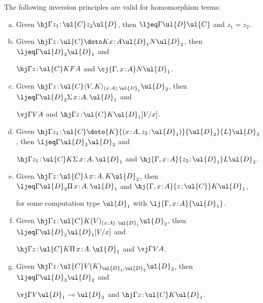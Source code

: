 \begin{proposition}
\label{prop:homterminversion}
The following inversion principles are valid for homomorphism terms:
\begin{enumerate}[(a)]
\item Given $\hj \Gamma {z_1 \!:\! \ul{C}} {z_2} \ul{D}$, then $\ljeq \Gamma {\ul{D}} {\ul{C}}$ and $z_1 = z_2$.
\item Given $\hj \Gamma {z \!:\! \ul{C}} {\doto K {x \!:\! A} {\ul{D}_1} {N}} \ul{D}_2$, then $\ljeq \Gamma {\ul{D}_2} {\ul{D}_1}$ and 

\vspace{-0.2cm}
\hfill $\hj \Gamma {z \!:\! \ul{C}} K {FA}$ and $\cj {\Gamma, x \!:\! A} N {\ul{D}_1}$.
\item Given $\hj \Gamma {z \!:\! \ul{C}} {\langle V , K \rangle_{(x : A).\ul{D}_1}} {\ul{D}_2}$, then $\ljeq \Gamma {\ul{D}_2} {\Sigma\, x \!:\! A .\, \ul{D}_1}$ and 

\vspace{-0.2cm}
\hfill $\vj \Gamma V A$ and $\hj \Gamma {z \!:\! \ul{C}} K {\ul{D}_1[V/x]}$.
\item Given $\hj \Gamma {z_1 \!:\! \ul{C}} {\doto {K} {(x \!:\! A , z_2 \!:\! \ul{D}_1)} {\ul{D}_2} {L}} {\ul{D}_3}$, then $\ljeq \Gamma {\ul{D}_3} {\ul{D}_2}$ and 

\vspace{-0.2cm}
\hfill $\hj \Gamma {z_1 \!:\! \ul{C}} K {\Sigma\, x \!:\! A .\, \ul{D}_1}$ and $\hj {\Gamma, x \!:\! A} {z_2 \!:\! \ul{D}_1} L {\ul{D}_2}$.
\item Given $\hj \Gamma {z \!:\! \ul{C}} {\lambda\, x \!:\! A .\, K} {\ul{D}_2}$, then $\ljeq \Gamma {\ul{D}_2} {\Pi\, x \!:\! A .\, \ul{D}_1}$ and $\hj {\Gamma, x \!:\! A} {z \!:\! \ul{C}} K {\ul{D}_1}$, 

\vspace{-0.2cm}
\hfill for some computation type $\ul{D}_1$ with $\lj {\Gamma, x \!:\! A} {\ul{D}_1}$.
\item Given $\hj \Gamma {z \!:\! \ul{C}} {K(V)_{(x : A) .\, \ul{D}_1}} {\ul{D}_2}$, then $\ljeq \Gamma {\ul{D}_2} {\ul{D}_1[V/x]}$ and 

\vspace{-0.2cm}
\hfill $\hj \Gamma {z \!:\! \ul{C}} K {\Pi\, x \!:\! A .\, \ul{D}_1}$ and $\vj \Gamma V A$.
\item Given $\hj \Gamma {z \!:\! \ul{C}} {V(K)_{\ul{D}_1, \ul{D}_2}} {\ul{D}_3}$, then $\ljeq \Gamma {\ul{D}_3} {\ul{D}_2}$ and 

\vspace{-0.2cm}
\hfill $\vj \Gamma V {\ul{D}_1 \multimap \ul{D}_2}$ and $\hj \Gamma {z \!:\! \ul{C}} K {\ul{D}_1}$.
\end{enumerate}
\end{proposition}

